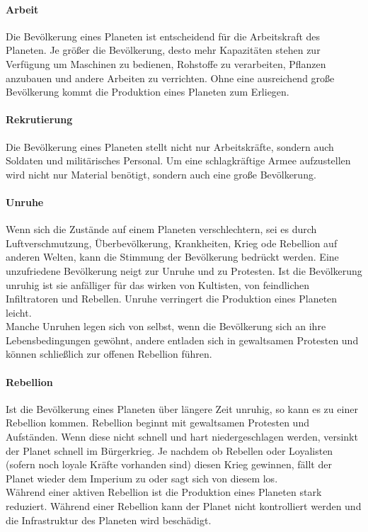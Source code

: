 \documentclass[11pt, a4paper]{article}
\begin{document}
\paragraph{Arbeit}
Die Bevölkerung eines Planeten ist entscheidend für die Arbeitskraft des Planeten. Je größer die Bevölkerung,
desto mehr Kapazitäten stehen zur Verfügung um Maschinen zu bedienen, Rohstoffe zu verarbeiten, Pflanzen
anzubauen und andere Arbeiten zu verrichten. Ohne eine ausreichend große Bevölkerung kommt die Produktion
eines Planeten zum Erliegen.
%
\paragraph{Rekrutierung}
Die Bevölkerung eines Planeten stellt nicht nur Arbeitskräfte, sondern auch Soldaten und militärisches
Personal. Um eine schlagkräftige Armee aufzustellen wird nicht nur Material benötigt, sondern auch eine große
Bevölkerung.
%
\paragraph{Unruhe}
Wenn sich die Zustände auf einem Planeten verschlechtern, sei es durch Luftverschmutzung, Überbevölkerung,
Krankheiten, Krieg ode Rebellion auf anderen Welten, kann die Stimmung der Bevölkerung bedrückt werden.
Eine unzufriedene Bevölkerung neigt zur Unruhe und zu Protesten. Ist die Bevölkerung unruhig ist sie anfälliger
für das wirken von Kultisten, von feindlichen Infiltratoren und Rebellen. Unruhe verringert die Produktion
eines Planeten leicht.\\
Manche Unruhen legen sich von selbst, wenn die Bevölkerung sich an ihre Lebensbedingungen gewöhnt, andere
entladen sich in gewaltsamen Protesten und können schließlich zur offenen Rebellion führen.
%
\paragraph{Rebellion}
Ist die Bevölkerung eines Planeten über längere Zeit unruhig, so kann es zu einer Rebellion kommen. Rebellion
beginnt mit gewaltsamen Protesten und Aufständen. Wenn diese nicht schnell und hart niedergeschlagen werden,
versinkt der Planet schnell im Bürgerkrieg. Je nachdem ob Rebellen oder Loyalisten (sofern noch loyale Kräfte
vorhanden sind) diesen Krieg gewinnen, fällt der Planet wieder dem Imperium zu oder sagt sich von diesem los.\\
Während einer aktiven Rebellion ist die Produktion eines Planeten stark reduziert. Während einer Rebellion kann
der Planet nicht kontrolliert werden und die Infrastruktur des Planeten wird beschädigt.
%
\end{document}
